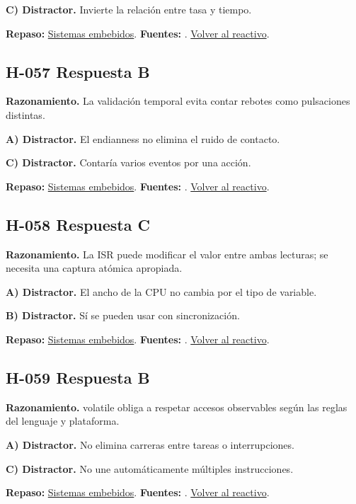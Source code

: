 \textbf{C) Distractor. }Invierte la relación entre tasa y tiempo.

\textbf{Repaso:} \hyperref[sec:h3]{Sistemas embebidos}. \textbf{Fuentes:} \cite{avr,arduino,sensors}. \hyperref[q:H-056]{Volver al reactivo}.\par\medskip

\subsection*{H-057 \quad Respuesta B}\label{s:H-057}
\textbf{Razonamiento.} La validación temporal evita contar rebotes como pulsaciones distintas.

\textbf{A) Distractor. }El endianness no elimina el ruido de contacto.

\textbf{C) Distractor. }Contaría varios eventos por una acción.

\textbf{Repaso:} \hyperref[sec:h3]{Sistemas embebidos}. \textbf{Fuentes:} \cite{avr,arduino,sensors}. \hyperref[q:H-057]{Volver al reactivo}.\par\medskip

\subsection*{H-058 \quad Respuesta C}\label{s:H-058}
\textbf{Razonamiento.} La ISR puede modificar el valor entre ambas lecturas; se necesita una captura atómica apropiada.

\textbf{A) Distractor. }El ancho de la CPU no cambia por el tipo de variable.

\textbf{B) Distractor. }Sí se pueden usar con sincronización.

\textbf{Repaso:} \hyperref[sec:h3]{Sistemas embebidos}. \textbf{Fuentes:} \cite{avr,arduino,sensors}. \hyperref[q:H-058]{Volver al reactivo}.\par\medskip

\subsection*{H-059 \quad Respuesta B}\label{s:H-059}
\textbf{Razonamiento.} volatile obliga a respetar accesos observables según las reglas del lenguaje y plataforma.

\textbf{A) Distractor. }No elimina carreras entre tareas o interrupciones.

\textbf{C) Distractor. }No une automáticamente múltiples instrucciones.

\textbf{Repaso:} \hyperref[sec:h3]{Sistemas embebidos}. \textbf{Fuentes:} \cite{avr,arduino,sensors}. \hyperref[q:H-059]{Volver al reactivo}.\par\medskip

